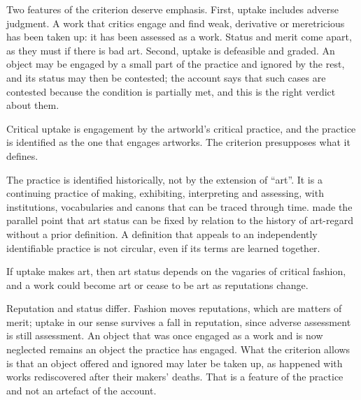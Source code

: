 \documentclass{situationist-preprint}
\begin{document}
Two features of the criterion deserve emphasis. First, uptake includes adverse judgment. A work that critics engage and find weak, derivative or meretricious has been taken up: it has been assessed as a work. Status and merit come apart, as they must if there is bad art. Second, uptake is defeasible and graded. An object may be engaged by a small part of the practice and ignored by the rest, and its status may then be contested; the account says that such cases are contested because the condition is partially met, and this is the right verdict about them.

\begin{objection}[Circularity]\label{o:circ}
Critical uptake is engagement by the artworld's critical practice, and the practice is identified as the one that engages artworks. The criterion presupposes what it defines.
\end{objection}

\begin{reply}
The practice is identified historically, not by the extension of \enquote{art}. It is a continuing practice of making, exhibiting, interpreting and assessing, with institutions, vocabularies and canons that can be traced through time. \citet{Levinson1979} made the parallel point that art status can be fixed by relation to the history of art-regard without a prior definition. A definition that appeals to an independently identifiable practice is not circular, even if its terms are learned together.
\end{reply}

\begin{objection}[Fashion]\label{o:fashion}
If uptake makes art, then art status depends on the vagaries of critical fashion, and a work could become art or cease to be art as reputations change.
\end{objection}

\begin{reply}
Reputation and status differ. Fashion moves reputations, which are matters of merit; uptake in our sense survives a fall in reputation, since adverse assessment is still assessment. An object that was once engaged as a work and is now neglected remains an object the practice has engaged. What the criterion allows is that an object offered and ignored may later be taken up, as happened with works rediscovered after their makers' deaths. That is a feature of the practice and not an artefact of the account.
\end{reply}
\end{document}
